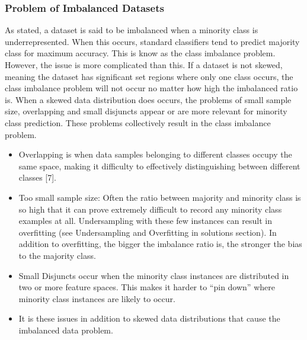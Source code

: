 \subsubsection{Problem of Imbalanced Datasets}
As stated, a dataset is said to be imbalanced when a minority class is underrepresented. When this occurs, standard classifiers tend to predict majority class for maximum accuracy. This is know as the class imbalance problem. However, the issue is more complicated than this. If a dataset is not skewed, meaning the dataset has significant set regions where only one class occurs, the class imbalance problem will not occur no matter how high the imbalanced ratio is. When a skewed data distribution does occurs, the problems of small sample size, overlapping and small disjuncts appear or are more relevant for minority class prediction. These problems collectively result in the class imbalance problem.
\begin{itemize}
    \item Overlapping is when data samples belonging to different classes occupy the same space, making it difficulty to effectively distinguishing between different classes [7].
    \item Too small sample size: Often the ratio between majority and minority class is so high that it can prove extremely difficult to record any minority class examples at all. Undersampling with these few instances can result in overfitting (see Undersampling and Overfitting in solutions section). In addition to overfitting, the bigger the imbalance ratio is, the stronger the bias to the majority class.
    \item Small Disjuncts occur when the minority class instances are distributed in two or more feature spaces. This makes it harder to “pin down” where minority class instances are likely to occur.
    \item It is these issues in addition to skewed data distributions that cause the imbalanced data problem. %
\end{itemize}

